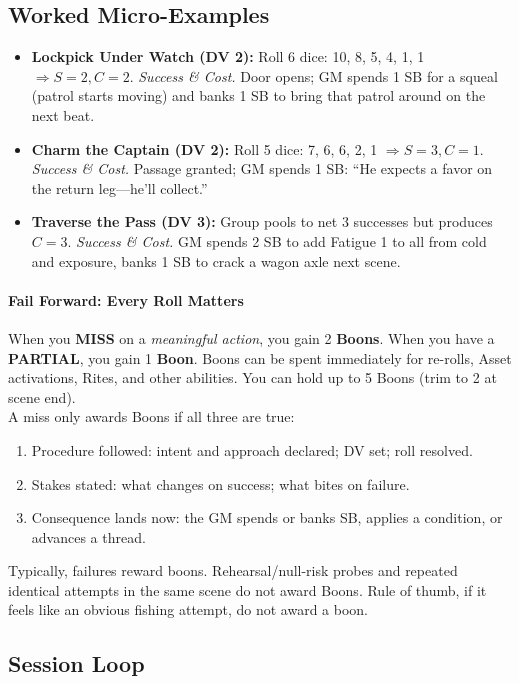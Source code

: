 \subsection{Worked Micro-Examples}
\begin{itemize}
  \item \textbf{Lockpick Under Watch (DV 2):} Roll 6 dice: 10, 8, 5, 4, 1, 1 $\Rightarrow S=2, C=2$. \emph{Success \& Cost.} Door opens; GM spends 1 SB for a squeal (patrol starts moving) and banks 1 SB to bring that patrol around on the next beat.
  \item \textbf{Charm the Captain (DV 2):} Roll 5 dice: 7, 6, 6, 2, 1 $\Rightarrow S=3, C=1$. \emph{Success \& Cost.} Passage granted; GM spends 1 SB: ``He expects a favor on the return leg—he'll collect.''
  \item \textbf{Traverse the Pass (DV 3):} Group pools to net 3 successes but produces $C=3$. \emph{Success \& Cost.} GM spends 2 SB to add Fatigue 1 to all from cold and exposure, banks 1 SB to crack a wagon axle next scene.
\end{itemize}

\paragraph{Fail Forward: Every Roll Matters}
When you \textbf{MISS} on a \emph{meaningful action}, you gain 2 \textbf{Boons}. When you have a \textbf{PARTIAL}, you gain 1 \textbf{Boon}. Boons can be spent immediately for re-rolls, Asset activations, Rites, and other abilities. You can hold up to 5 Boons (trim to 2 at scene end).\\
A miss only awards Boons if all three are true:
\begin{enumerate}
  \item Procedure followed: intent and approach declared; DV set; roll resolved.
  \item Stakes stated: what changes on success; what bites on failure.
  \item Consequence lands now: the GM spends or banks SB, applies a condition, or advances a thread.
\end{enumerate}
Typically, failures reward boons. Rehearsal/null-risk probes and repeated identical attempts in the same scene do not award Boons. Rule of thumb, if it feels like an obvious fishing attempt, do not award a boon.

\subsection{Session Loop}

